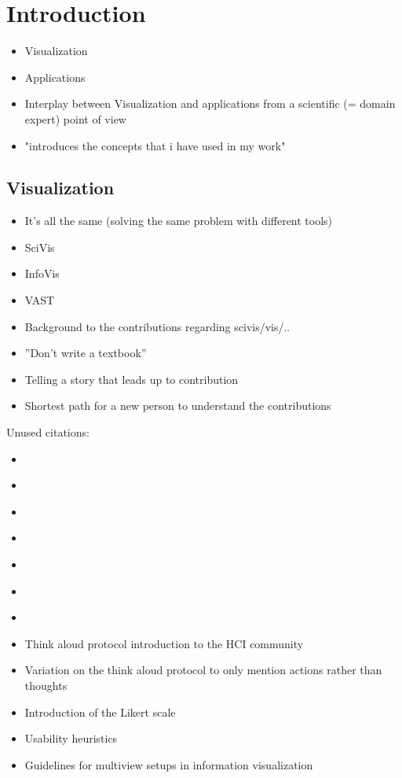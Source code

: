 \chapter{Introduction}
\label{ch:introduction}

\begin{itemize}
\item Visualization
\item Applications
\item Interplay between Visualization and applications from a scientific (= domain expert) point of view
\item "introduces the concepts that i have used in my work"

\end{itemize}

\section{Visualization}
\begin{itemize}
\item It's all the same (solving the same problem with different tools)
\item SciVis
\item InfoVis
\item VAST
\item Background to the contributions regarding scivis/vis/..
\item ''Don't write a textbook''
\item Telling a story that leads up to contribution 
\item Shortest path for a new person to understand the contributions
\end{itemize}

Unused citations:
\begin{itemize}
\item \cite{tory2005evaluating}
\item \cite{munzner2009nested}
\item \cite{tory2004human}
\item \cite{kirby2013visualization}
\item \cite{van2006bridging}
\item \cite{kosara2003thoughts}
\item \cite{carpendale2008evaluating}

\item \cite{lewis1993task} Think aloud protocol introduction to the HCI community
\item \cite{ericsson1980verbal} Variation on the think aloud protocol to only mention actions rather than thoughts
\item \cite{likert1932technique} Introduction of the Likert scale
\item \cite{nielsen1994heuristic} Usability heuristics
\item \cite{wang2000guidelines} Guidelines for multiview setups in information visualization
\end{itemize}